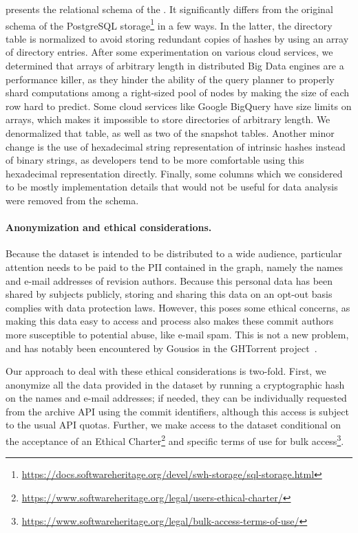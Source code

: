  presents the relational schema of the \SWHGD{}.
It significantly differs from the original schema of the PostgreSQL
storage\footnote{\url{https://docs.softwareheritage.org/devel/swh-storage/sql-storage.html}}
in a few ways. In the latter, the directory table is normalized to avoid storing
redundant copies of hashes by using an array of directory entries. After some
experimentation on various cloud services, we determined that arrays of
arbitrary length in distributed Big Data engines are a performance killer, as
they hinder the ability of the query planner to properly shard computations
among a right-sized pool of nodes by making the size of each row hard to
predict. Some cloud services like Google BigQuery have size limits on arrays,
which makes it impossible to store directories of arbitrary length. We
denormalized that table, as well as two of the snapshot tables. Another minor
change is the use of hexadecimal string representation of intrinsic hashes
instead of binary strings, as developers tend to be more comfortable using
this hexadecimal representation directly. Finally, some columns which we
considered to be mostly implementation details that would not be useful for
data analysis were removed from the schema.

\paragraph*{Anonymization and ethical considerations.}
Because the dataset is intended to be distributed to a wide audience,
particular attention needs to be paid to the \gls{PII} contained in the graph,
namely the names and e-mail addresses of revision authors. Because this
personal data has been shared by subjects publicly, storing and sharing this
data on an opt-out basis complies with data protection laws. However, this
poses some ethical concerns, as making this data easy to access and process
also makes these commit authors more susceptible to potential abuse, like
e-mail spam. This is not a new problem, and has notably been encountered by
Gousios in the GHTorrent project~\cite{gousios2016issue32}.

Our approach to deal with these ethical considerations is two-fold. First, we
anonymize all the data provided in the dataset by running a cryptographic hash
on the names and e-mail addresses; if needed, they can be individually
requested from the archive API using the commit identifiers, although this
access is subject to the usual API quotas. Further, we make access to the
dataset conditional on the acceptance of an Ethical
Charter\footnote{\url{https://www.softwareheritage.org/legal/users-ethical-charter/}}
and specific terms of use for bulk
access\footnote{\url{https://www.softwareheritage.org/legal/bulk-access-terms-of-use/}}.

